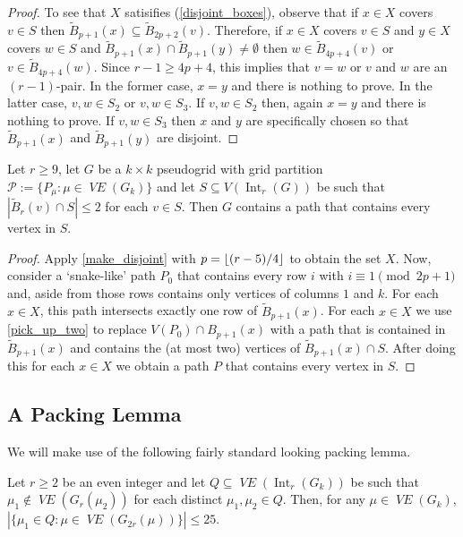 \documentclass{patmorin}
\DeclareMathOperator{\interior}{Int}
\DeclareMathOperator{\VE}{\mathit{VE}}
\begin{document}
\begin{proof}
  To see that $X$ satisifies (\ref{disjoint_boxes}), observe that if $x\in X$ covers $v\in S$ then $\tilde{B}_{p+1}(x)\subseteq \tilde{B}_{2p+2}(v)$. Therefore, if $x\in X$ covers $v\in S$ and $y\in X$ covers $w\in S$ and $\tilde{B}_{p+1}(x)\cap \tilde{B}_{p+1}(y)\neq\emptyset$ then $w\in \tilde{B}_{4p+4}(v)$ or $v\in \tilde{B}_{4p+4}(w)$.  Since $r-1 \ge 4p+4$, this implies that $v=w$ or $v$ and $w$ are an $(r-1)$-pair.  In the former case, $x=y$ and there is nothing to prove. In the latter case, $v,w\in S_2$ or $v,w\in S_3$.  If $v,w\in S_2$ then, again $x=y$ and there is nothing to prove.  If $v,w\in S_3$ then $x$ and $y$ are specifically chosen so that $\tilde{B}_{p+1}(x)$ and $\tilde{B}_{p+1}(y)$ are disjoint.
\end{proof}


\begin{lem}\label{pick_up_everything}
  Let $r\ge 9$, let $G$ be a $k\times k$ pseudogrid with grid partition $\mathcal{P}:=\{P_\mu:\mu\in\VE(G_k)\}$ and let $S\subseteq V(\interior_r(G))$ be such that $|\tilde{B}_{r}(v)\cap S|\le 2$ for each $v\in S$. Then $G$ contains a path that contains every vertex in $S$.
\end{lem}

\begin{proof}
  Apply \cref{make_disjoint} with $p={\lfloor (r-5)/4 \rfloor}$ to obtain the set $X$.  Now, consider a `snake-like' path $P_0$ that contains every row $i$ with $i\equiv 1\pmod{2p+1}$ and, aside from those rows contains only vertices of columns $1$ and $k$.   For each $x\in X$, this path intersects exactly one row of $\tilde{B}_{p+1}(x)$.  For each $x\in X$ we use \cref{pick_up_two} to replace $V(P_0)\cap B_{p+1}(x)$ with a path that is contained in $\tilde{B}_{p+1}(x)$ and contains the (at most two) vertices of $\tilde{B}_{p+1}(x)\cap S$.  After doing this for each $x\in X$ we obtain a path $P$ that contains every vertex in $S$.
\end{proof}

\subsection{A Packing Lemma}
\label{packing_lemma_sec}

We will make use of the following fairly standard looking packing lemma.

\begin{lem}\label{packing_lemma}
  Let $r\ge 2$ be an even integer and let $Q\subseteq \VE(\interior_r(G_k))$ be such that $\mu_1\not\in \VE(G_r(\mu_2))$ for each distinct $\mu_1,\mu_2\in Q$.  Then, for any $\mu\in \VE(G_k)$,
  $|\{\mu_1\in Q: \mu\in \VE(G_{2r}(\mu))\}| \le 25$.
\end{lem}
\end{document}
